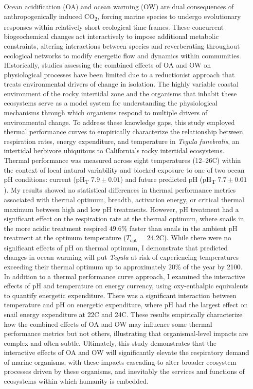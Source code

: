 \documentclass{CSUNthesis}
\begin{document}
\begin{spacing}{1.5}

  \indent Ocean acidification (OA) and ocean warming (OW) are dual consequences of anthropogenically induced CO\textsubscript{2}, forcing marine species to undergo evolutionary responses within relatively short ecological time frames. These concurrent biogeochemical changes act interactively to impose additional metabolic constraints, altering interactions between species and reverberating throughout ecological networks to modify energetic flow and dynamics within communities. Historically, studies assessing the combined effects of OA and OW on physiological processes have been limited due to a reductionist approach that treats environmental drivers of change in isolation. The highly variable coastal environment of the rocky intertidal zone and the organisms that inhabit these ecosystems serve as a model system for understanding the physiological mechanisms through which organisms respond to multiple drivers of environmental change. To address these knowledge gaps, this study employed thermal performance curves to empirically characterize the relationship between respiration rates, energy expenditure, and temperature in \textit{Tegula funebralis}, an intertidal herbivore ubiquitous to California’s rocky intertidal ecosystems. Thermal performance was measured across eight temperatures (12–26\textdegree C) within the context of local natural variability and blocked exposure to one of two ocean pH conditions: current (pH\textsubscript{T} $7.9 \pm 0.01$) and future predicted pH (pH\textsubscript{T} $7.7 \pm 0.01$). My results showed no statistical differences in thermal performance metrics associated with thermal optimum, breadth, activation energy, or critical thermal maximum between high and low pH treatments. However, pH treatment had a significant effect on the respiration rate at the thermal optimum, where snails in the more acidic treatment respired $49.6\%$ faster than snails in the ambient pH treatment at the optimum temperature ($T_\mathrm{opt}$ = 24.2\textdegree C). While there were no significant effects of pH on thermal optimum, I demonstrate that predicted changes in ocean warming will put \textit{Tegula} at risk of experiencing temperatures exceeding their thermal optimum up to approximately $20\%$ of the year by 2100. In addition to a thermal performance curve approach, I examined the interactive effects of pH and temperature on energy currency, using oxy-enthalpic equivalents to quantify energetic expenditure. There was a significant interaction between temperature and pH on energetic expenditure, where pH had the largest effect on snail energy expenditure at 22\textdegree C and 24\textdegree C. These results empirically characterize how the combined effects of OA and OW may influence some thermal performance metrics but not others, illustrating that organismal-level impacts are complex and often subtle. Ultimately, this study demonstrates that the interactive effects of OA and OW will significantly elevate the respiratory demand of marine organisms, with these impacts cascading to alter broader ecosystem processes driven by these organisms, and inevitably the services and functions of ecosystems within which humanity is embedded.
  

\end{spacing}
\end{document}
